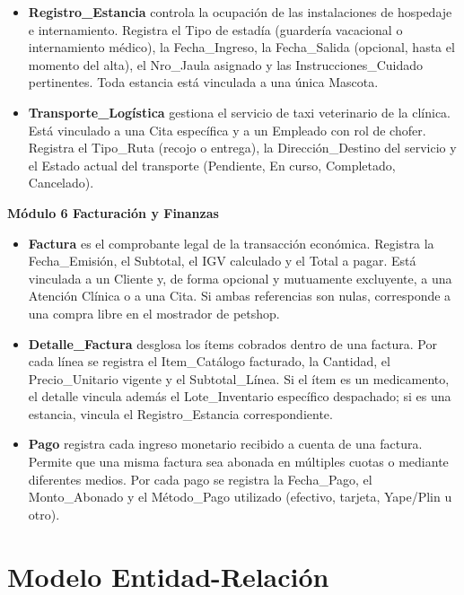 \begin{itemize}
	\item \textbf{Registro\_Estancia} controla la ocupación de las instalaciones de hospedaje e internamiento. Registra el Tipo de estadía (guardería vacacional o internamiento médico), la Fecha\_Ingreso, la Fecha\_Salida (opcional, hasta el momento del alta), el Nro\_Jaula asignado y las Instrucciones\_Cuidado pertinentes. Toda estancia está vinculada a una única Mascota.
	\item \textbf{Transporte\_Logística} gestiona el servicio de taxi veterinario de la clínica. Está vinculado a una Cita específica y a un Empleado con rol de chofer. Registra el Tipo\_Ruta (recojo o entrega), la Dirección\_Destino del servicio y el Estado actual del transporte (Pendiente, En curso, Completado, Cancelado).
\end{itemize}

\vspace{0.5cm}
\noindent \textbf{Módulo 6 Facturación y Finanzas}

\begin{itemize}
	\item \textbf{Factura} es el comprobante legal de la transacción económica. Registra la Fecha\_Emisión, el Subtotal, el IGV calculado y el Total a pagar. Está vinculada a un Cliente y, de forma opcional y mutuamente excluyente, a una Atención Clínica o a una Cita. Si ambas referencias son nulas, corresponde a una compra libre en el mostrador de petshop.
	\item \textbf{Detalle\_Factura} desglosa los ítems cobrados dentro de una factura. Por cada línea se registra el Item\_Catálogo facturado, la Cantidad, el Precio\_Unitario vigente y el Subtotal\_Línea. Si el ítem es un medicamento, el detalle vincula además el Lote\_Inventario específico despachado; si es una estancia, vincula el Registro\_Estancia correspondiente.
	\item \textbf{Pago} registra cada ingreso monetario recibido a cuenta de una factura. Permite que una misma factura sea abonada en múltiples cuotas o mediante diferentes medios. Por cada pago se registra la Fecha\_Pago, el Monto\_Abonado y el Método\_Pago utilizado (efectivo, tarjeta, Yape/Plin u otro).
\end{itemize}

\section{Modelo Entidad-Relación}

